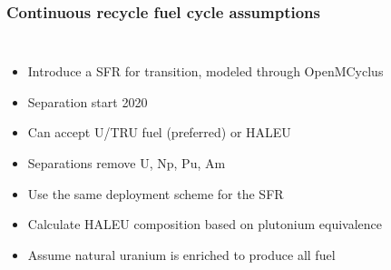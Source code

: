 \begin{frame}
    \frametitle{Continuous recycle fuel cycle assumptions}
    \begin{columns}
        
    \column[t]{6cm}
    \vspace{-0.5cm}
    

        \column[t]{4.5cm}
        \begin{itemize}
            \item Introduce a \gls{SFR} for transition, modeled through 
                  OpenMCyclus
            \item Separation start 2020
            \item Can accept U/TRU fuel (preferred) or \gls{HALEU}
            \item Separations remove U, Np, Pu, Am
            \item<2-> Use the same deployment scheme for the \gls{SFR}
            \item<2-> Calculate \gls{HALEU} composition based on plutonium
                      equivalence
            \item<3-> Assume natural uranium is enriched to produce all 
                  fuel
        \end{itemize}

\end{columns}
\end{frame}

